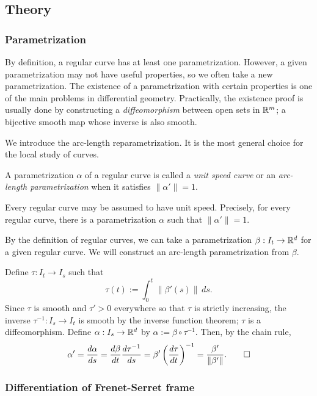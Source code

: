 \documentclass{../exp}
\def\a{\alpha}
\begin{document}
\subsection{Theory}

\subsubsection{Parametrization}

By definition, a regular curve has at least one parametrization.
However, a given parametrization may not have useful properties, so we often take a new parametrization.
The existence of a parametrization with certain properties is one of the main problems in differential geometry.
Practically, the existence proof is usually done by constructing a \emph{diffeomorphism} between open sets in $\mathbb{R}^m$; a bijective smooth map whose inverse is also smooth.

We introduce the arc-length reparametrization.
It is the most general choice for the local study of curves.
\begin{defn}
A parametrization $\a$ of a regular curve is called a \emph{unit speed curve} or an \emph{arc-length parametrization} when it satisfies $\|\a'\|=1$.
\end{defn}
\begin{thm}
Every regular curve may be assumed to have unit speed.
Precisely, for every regular curve, there is a parametrization $\a$ such that $\|\a'\|=1$.
\end{thm}
\begin{pf}
By the definition of regular curves, we can take a parametrization $\beta:I_t\to\R^d$ for a given regular curve.
We will construct an arc-length parametrization from $\beta$.

Define $\tau:I_t\to I_s$ such that
\[\tau(t):=\int_0^t\|\beta'(s)\|\,ds.\]
Since $\tau$ is smooth and $\tau'>0$ everywhere so that $\tau$ is strictly increasing, the inverse $\tau^{-1}:I_s\to I_t$ is smooth by the inverse function theorem; $\tau$ is a diffeomorphism.
Define $\a:I_s\to\R^d$ by $\a:=\beta\circ\tau^{-1}$.
Then, by the chain rule,
\[\a'=\dd{\a}{s}=\dd{\beta}{t}\dd{\tau^{-1}}{s}=\beta'\left(\dd{\tau}{t}\right)^{-1}=\frac{\beta'}{\|\beta'\|}.\qedhere\]
\end{pf}




\subsubsection{Differentiation of Frenet-Serret frame}
\end{document}

